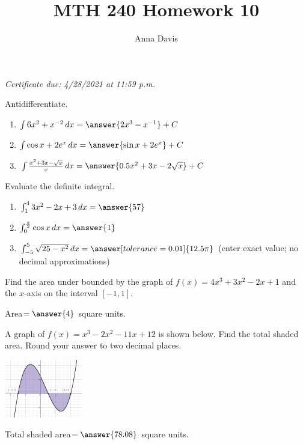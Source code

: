 \documentclass{ximera}
\author{Anna Davis} \title{MTH 240 Homework 10}
\begin{document}
\begin{abstract}

\end{abstract}
\maketitle
 \textit{Certificate due: 4/28/2021 at 11:59 p.m.}
 
\begin{problem}\label{prob:240HW10prob1}
Antidifferentiate.
\begin{enumerate}
\item
$\int 6x^2+x^{-2}\,dx=\answer{2x^3-x^{-1}}+C$

\item
$\int \cos x+2e^x\, dx=\answer{\sin x +2e^x}+C$

\item
$\int \frac{x^2+3x-\sqrt{x}}{x}\,dx=\answer{0.5x^2+3x-2\sqrt{x}}+C$

  \end{enumerate}
\end{problem}

\begin{problem}\label{prob:240HW10prob2}
Evaluate the definite integral.

\begin{enumerate}
    \item $\int_1^4 3x^2-2x+3\,dx=\answer{57}$
    \item $\int_0^{\frac{\pi}{2}} \cos x\,dx=\answer{1}$
    \item $\int_{-5}^5 \sqrt{25-x^2}\,dx=\answer[tolerance=0.01]{12.5\pi}$ (enter exact value; no decimal approximations)
\end{enumerate}
\end{problem}

\begin{problem}\label{prob:240HW10prob3}
Find the area under bounded by the graph of $f(x)=4x^3+3x^2-2x+1$ and the $x$-axis on the interval $[-1,1]$.

Area$=\answer{4}$ square units.
\end{problem}


\begin{problem}\label{prob:240HW10prob4}
A graph of $f(x)=x^3-2x^2-11x+12$ is shown below.  Find the total shaded area.  Round your answer to two decimal places.
\begin{image}
   
\includegraphics[height=1in]{HW10pic1.jpg}

\end{image}

Total shaded area$=\answer{78.08}$ square units.
\end{problem}
\end{document}

